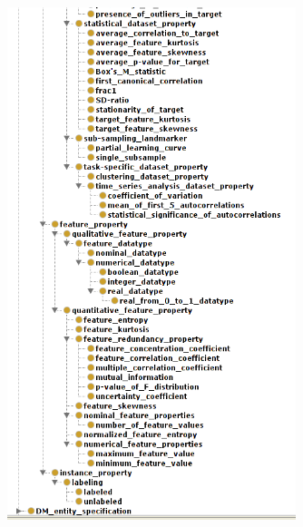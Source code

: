 \documentclass[a4paper,12pt, english]{article}
\begin{document}
\begin{figure}[h]   
  \centering 
  \includegraphics[width=0.75\textwidth]{../figs/expose2-3}
  \caption{}
  \label{fig:expose2-3}
\end{figure}
\end{document}
